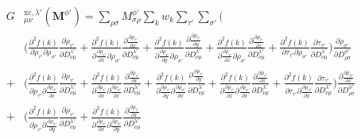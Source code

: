 \documentclass[preprint,preprintnumbers,amsmath,amssymb,11pt]{revtex4}
\def\xc{\textrm{xc}}
\begin{document}
\begin{eqnarray}
&G&^{\xc,\lambda'}_{\mu \nu}( \textbf{M}^{\phi'} )=  \sum_{\rho \sigma} M^{\phi'}_{ \sigma \rho} \sum_{k} w_{k} \sum_{\tau'}\sum_{\sigma'}\biggl(\\
& \phantom{=} &\biggl( \frac{\partial^{2} f(k)}{\partial \rho_{\tau'} \partial \rho_{\sigma'}} \frac{\partial \rho_{\tau'}}{\partial D^{\lambda'}_{\nu \mu}} 
+ \frac{\partial^{2} f(k)}{\partial \frac{\partial \rho_{\tau'}}{\partial x} \partial \rho_{\sigma'}} \frac{\partial \frac{\partial \rho_{\tau'}}{\partial x}}{\partial D^{\lambda'}_{\nu \mu}}
+ \frac{\partial^{2} f(k)}{\partial \frac{\partial \rho_{\tau'}}{\partial y} \partial \rho_{\sigma'}} \frac{\partial \frac{\partial \rho_{\tau'}}{\partial y}}{\partial D^{\lambda'}_{\nu \mu}}+ \frac{\partial^{2} f(k)}{\partial \frac{\partial \rho_{\tau'}}{\partial z} \partial \rho_{\sigma'}} \frac{\partial \frac{\partial \rho_{\tau'}}{\partial z}}{\partial D^{\lambda'}_{\nu \mu}} + \frac{\partial^{2} f(k)}{\partial \tau_{\tau'} \partial \rho_{\sigma'}} \frac{\partial \tau_{\tau'}}{\partial D^{\lambda'}_{\nu \mu}}\biggr) \frac{\partial \rho_{\sigma'}}{\partial D^{\phi'}_{\rho \sigma}}\nonumber\\
%
&+&\biggl( \frac{\partial^{2} f(k)}{\partial \rho_{\tau'} \partial \frac{\partial \rho_{\sigma'}}{\partial x}} \frac{\partial \rho_{\tau'} }{\partial D^{\lambda'}_{\nu \mu}} 
+ \frac{\partial^{2} f(k)}{\partial \frac{\partial \rho_{\tau'}}{\partial x} \partial \frac{\partial \rho_{\sigma'}}{\partial x}} \frac{\partial \frac{\partial \rho_{\tau'}}{\partial x}}{\partial D^{\lambda'}_{\nu \mu}}
+ \frac{\partial^{2} f(k)}{\partial \frac{\partial \rho_{\tau'}}{\partial y} \partial \frac{\partial \rho_{\sigma'}}{\partial x}} \frac{\partial \frac{\partial \rho_{\tau'}}{\partial y}}{\partial D^{\lambda'}_{\nu \mu}}+ \frac{\partial^{2} f(k)}{\partial \frac{\partial \rho_{\tau'}}{\partial z} \partial \frac{\partial \rho_{\sigma'}}{\partial x}} \frac{\partial \frac{\partial \rho_{\tau'}}{\partial z}}{\partial D^{\lambda'}_{\nu \mu}} + \frac{\partial^{2} f(k)}{\partial \tau_{\tau'} \partial \frac{\partial \rho_{\sigma'}}{\partial x}} \frac{\partial \tau_{\tau'} }{\partial D^{\lambda'}_{\nu \mu}}\biggr) \frac{\partial \frac{\partial \rho_{\sigma'}}{\partial x}}{\partial D^{\phi'}_{\rho \sigma}}\nonumber\\
&+&\biggl( \frac{\partial^{2} f(k)}{\partial \rho_{\tau'} \partial \frac{\partial \rho_{\sigma'}}{\partial y}} \frac{\partial \rho_{\tau'}}{\partial D^{\lambda'}_{\nu \mu}} 
+ \frac{\partial^{2} f(k)}{\partial \frac{\partial \rho_{\tau'}}{\partial x} \partial \frac{\partial \rho_{\sigma'}}{\partial y}} \frac{\partial \frac{\partial \rho_{\tau'}}{\partial x}}{\partial D^{\lambda'}_{\nu \mu}}

\end{eqnarray}
\end{document}
